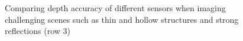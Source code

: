 \begin{figure}
    \centering
    \caption{Comparing depth accuracy of different sensors when imaging challenging scenes such as thin and hollow structures and strong reflections (row $3$)}
    \label{fig:depth_comparison}
\end{figure}
